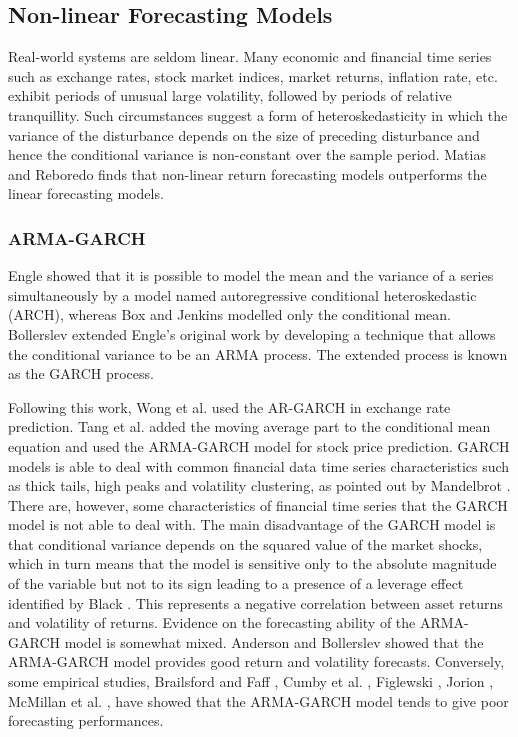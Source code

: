 \subsection{Non-linear Forecasting Models}
Real-world systems are seldom linear. Many economic and financial time series such as exchange rates, stock market indices, market returns, inflation rate, etc. exhibit periods of unusual large volatility, followed by periods of relative tranquillity. Such circumstances suggest a form of heteroskedasticity in which the variance of the disturbance depends on the size of preceding disturbance and hence the conditional variance is non-constant over the sample period. Matias and Reboredo \cite{M&R} finds that non-linear return forecasting models outperforms the linear forecasting models.

\subsubsection{ARMA-GARCH}
Engle \cite{Engel} showed that it is possible to model the mean and the variance of a series simultaneously by a model named autoregressive conditional heteroskedastic (ARCH), whereas Box and Jenkins \cite{B&J} modelled only the conditional mean. Bollerslev \cite{Bollerslev} extended Engle’s \cite{Engel} original work by developing a technique that allows the conditional variance to be an ARMA process. The extended process is known as the GARCH process. 

Following this work, Wong et al. \cite{Wetal} used the AR-GARCH in exchange rate prediction. Tang et al. \cite{Tetal} added the moving average part to the conditional mean equation and used the ARMA-GARCH model for stock price prediction. GARCH models is able to deal with common financial data time series characteristics such as thick tails, high peaks and volatility clustering, as pointed out by Mandelbrot \cite{Mandelbrot}. There are, however, some characteristics of financial time series that the GARCH model is not able to deal with. The main disadvantage of the GARCH model is that conditional variance depends on the squared value of the market shocks, which in turn means that the model is sensitive only to the absolute magnitude of the variable but not to its sign leading to a presence of a leverage effect identified by Black \cite{Black}. This represents a negative correlation between asset returns and volatility of returns. Evidence on the forecasting ability of the ARMA-GARCH model is somewhat mixed. Anderson and Bollerslev \cite{A&B} showed that the ARMA-GARCH model provides good return and volatility forecasts. Conversely, some empirical studies, Brailsford and Faff \cite{f1}, Cumby et al. \cite{f2}, Figlewski \cite{f3}, Jorion \cite{f4}\cite{f5}, McMillan et al. \cite{f6}, have showed that the ARMA-GARCH model tends to give poor forecasting performances. 

